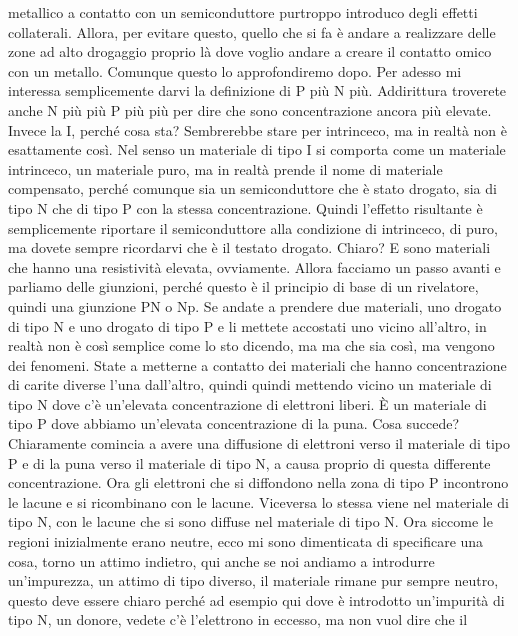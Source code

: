 metallico a contatto con un semiconduttore purtroppo introduco degli effetti collaterali. Allora, per evitare questo, quello che si fa è andare a realizzare delle zone ad alto drogaggio proprio là dove voglio andare a creare il contatto omico con un metallo. Comunque questo lo approfondiremo dopo. Per adesso mi interessa semplicemente darvi la definizione di P più N più. Addirittura troverete anche N più più P più più per dire che sono concentrazione ancora più elevate. Invece la I, perché cosa sta? Sembrerebbe stare per intrinceco, ma in realtà non è esattamente così. Nel senso un materiale di tipo I si comporta come un materiale intrinceco, un materiale puro, ma in realtà prende il nome di materiale compensato, perché comunque sia un semiconduttore che è stato drogato, sia di tipo N che di tipo P con la stessa concentrazione. Quindi l'effetto risultante è semplicemente riportare il semiconduttore alla condizione di intrinceco, di puro, ma dovete sempre ricordarvi che è il testato drogato. Chiaro? E sono materiali che hanno una resistività elevata, ovviamente. Allora facciamo un passo avanti e parliamo delle giunzioni, perché questo è il principio di base di un rivelatore, quindi una giunzione PN o Np. Se andate a prendere due materiali, uno drogato di tipo N e uno drogato di tipo P e li mettete accostati uno vicino all'altro, in realtà non è così semplice come lo sto dicendo, ma ma che sia così, ma vengono dei fenomeni. State a metterne a contatto dei materiali che hanno concentrazione di carite diverse l'una dall'altro, quindi quindi mettendo vicino un materiale di tipo N dove c'è un'elevata concentrazione di elettroni liberi. È un materiale di tipo P dove abbiamo un'elevata concentrazione di la puna. Cosa succede? Chiaramente comincia a avere una diffusione di elettroni verso il materiale di tipo P e di la puna verso il materiale di tipo N, a causa proprio di questa differente concentrazione. Ora gli elettroni che si diffondono nella zona di tipo P incontrono le lacune e si ricombinano con le lacune. Viceversa lo stessa viene nel materiale di tipo N, con le lacune che si sono diffuse nel materiale di tipo N. Ora siccome le regioni inizialmente erano neutre, ecco mi sono dimenticata di specificare una cosa, torno un attimo indietro, qui anche se noi andiamo a introdurre un'impurezza, un attimo di tipo diverso, il materiale rimane pur sempre neutro, questo deve essere chiaro perché ad esempio qui dove è introdotto un'impurità di tipo N, un donore, vedete c'è l'elettrono in eccesso, ma non vuol dire che il 

